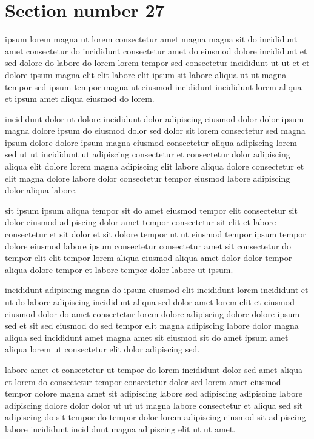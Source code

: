 \documentclass{article}
\begin{document}
\section{Section number 27}\label{sec:27}
ipsum lorem magna ut lorem consectetur amet magna magna sit do incididunt amet consectetur do incididunt consectetur amet do eiusmod dolore incididunt et sed dolore do labore do lorem lorem tempor sed consectetur incididunt ut ut et et dolore ipsum magna elit elit labore elit ipsum sit labore aliqua ut ut magna tempor sed ipsum tempor magna ut eiusmod incididunt incididunt lorem aliqua et ipsum amet aliqua eiusmod do lorem.

incididunt dolor ut dolore incididunt dolor adipiscing eiusmod dolor dolor ipsum magna dolore ipsum do eiusmod dolor sed dolor sit lorem consectetur sed magna ipsum dolore dolore ipsum magna eiusmod consectetur aliqua adipiscing lorem sed ut ut incididunt ut adipiscing consectetur et consectetur dolor adipiscing aliqua elit dolore lorem magna adipiscing elit labore aliqua dolore consectetur et elit magna dolore labore dolor consectetur tempor eiusmod labore adipiscing dolor aliqua labore.

sit ipsum ipsum aliqua tempor sit do amet eiusmod tempor elit consectetur sit dolor eiusmod adipiscing dolor amet tempor consectetur sit elit et labore consectetur et sit dolor et sit dolore tempor ut ut eiusmod tempor ipsum tempor dolore eiusmod labore ipsum consectetur consectetur amet sit consectetur do tempor elit elit tempor lorem aliqua eiusmod aliqua amet dolor dolor tempor aliqua dolore tempor et labore tempor dolor labore ut ipsum.

incididunt adipiscing magna do ipsum eiusmod elit incididunt lorem incididunt et ut do labore adipiscing incididunt aliqua sed dolor amet lorem elit et eiusmod eiusmod dolor do amet consectetur lorem dolore adipiscing dolore dolore ipsum sed et sit sed eiusmod do sed tempor elit magna adipiscing labore dolor magna aliqua sed incididunt amet magna amet sit eiusmod sit do amet ipsum amet aliqua lorem ut consectetur elit dolor adipiscing sed.

labore amet et consectetur ut tempor do lorem incididunt dolor sed amet aliqua et lorem do consectetur tempor consectetur dolor sed lorem amet eiusmod tempor dolore magna amet sit adipiscing labore sed adipiscing adipiscing labore adipiscing dolore dolor dolor ut ut ut magna labore consectetur et aliqua sed sit adipiscing do sit tempor do tempor dolor lorem adipiscing eiusmod sit adipiscing labore incididunt incididunt magna adipiscing elit ut ut amet.
\end{document}
